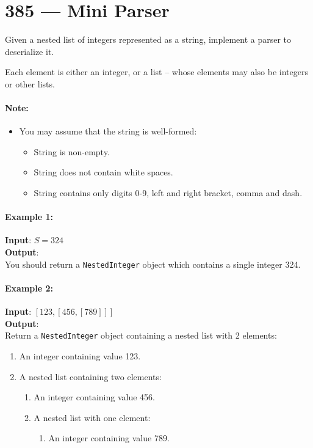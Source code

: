 \section{385 --- Mini Parser}
Given a nested list of integers represented as a string, implement a parser to deserialize it.
\par
Each element is either an integer, or a list -- whose elements may also be integers or other lists.

\paragraph{Note:} 
\begin{itemize}
\item You may assume that the string is well-formed:
\begin{itemize}
\item String is non-empty.
\item String does not contain white spaces.
\item String contains only digits 0-9, left and right bracket, comma and dash.
\end{itemize}

\end{itemize}


\paragraph{Example 1:}
\begin{flushleft}
\textbf{Input}: $S=324$
\\
\textbf{Output}:
\\
You should return a \texttt{NestedInteger} object which contains a single integer 324.
\end{flushleft}

\paragraph{Example 2:}
\begin{flushleft}
\textbf{Input}: $[123,[456,[789]]]$
\\
\textbf{Output}:
\\
Return a \texttt{NestedInteger} object containing a nested list with 2 elements:
\begin{enumerate}
\item An integer containing value 123.
\item A nested list containing two elements:
\begin{enumerate}
\item An integer containing value 456.
\item A nested list with one element:
\begin{enumerate}
\item An integer containing value 789.
\end{enumerate}
\end{enumerate}
\end{enumerate}
\end{flushleft}

